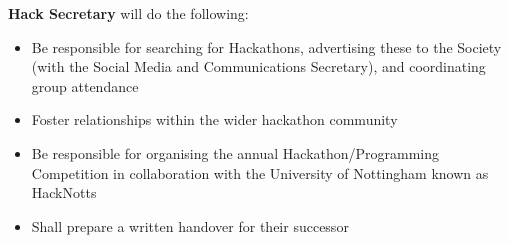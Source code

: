 \item \textbf{Hack Secretary} will do the following:
\begin{itemize}
  \item Be responsible for searching for Hackathons, advertising these to the Society (with the Social Media and Communications Secretary), and coordinating group attendance
  \item Foster relationships within the wider hackathon community
  \item Be responsible for organising the annual Hackathon/Programming Competition in collaboration with the University of Nottingham known as HackNotts
  \item Shall prepare a written handover for their successor
\end{itemize}